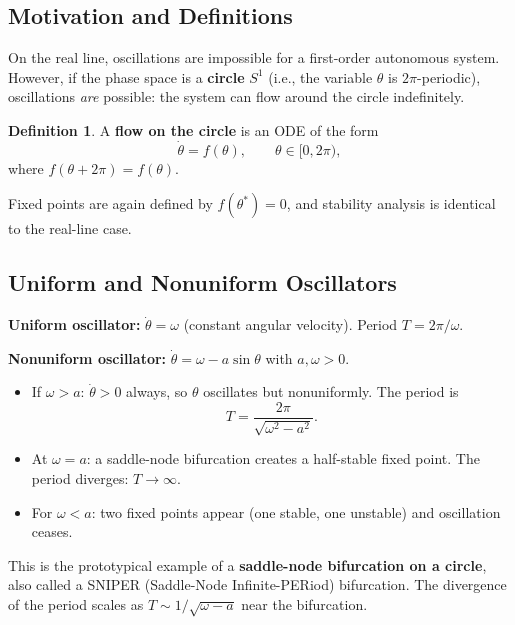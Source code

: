 \documentclass[11pt,letterpaper]{article}
\theoremstyle{definition}
\newtheorem{definition}{Definition}[section]
\theoremstyle{plain}
\theoremstyle{remark}
\newcommand{\thetadot}{\dot{\theta}}
\begin{document}
\subsection{Motivation and Definitions}

On the real line, oscillations are impossible for a first-order autonomous
system.  However, if the phase space is a \textbf{circle} $S^1$
(i.e., the variable $\theta$ is $2\pi$-periodic), oscillations \emph{are}
possible: the system can flow around the circle indefinitely.

\begin{definition}
A \textbf{flow on the circle} is an ODE of the form
\begin{equation}
  \thetadot = f(\theta), \qquad \theta \in [0, 2\pi),
\end{equation}
where $f(\theta+2\pi) = f(\theta)$.
\end{definition}

Fixed points are again defined by $f(\theta^*)=0$, and stability analysis is
identical to the real-line case.

\subsection{Uniform and Nonuniform Oscillators}

\textbf{Uniform oscillator:} $\thetadot = \omega$ (constant angular
velocity).  Period $T = 2\pi/\omega$.

\textbf{Nonuniform oscillator:} $\thetadot = \omega - a\sin\theta$
with $a,\omega > 0$.
\begin{itemize}[leftmargin=2em]
\item If $\omega > a$: $\thetadot > 0$ always, so $\theta$ oscillates but
      nonuniformly.  The period is
      \begin{equation}\label{eq:nonuniform-period}
        T = \frac{2\pi}{\sqrt{\omega^2 - a^2}}.
      \end{equation}
\item At $\omega = a$: a saddle-node bifurcation creates a half-stable
      fixed point.  The period diverges: $T\to\infty$.
\item For $\omega < a$: two fixed points appear (one stable, one unstable)
      and oscillation ceases.
\end{itemize}

This is the prototypical example of a \textbf{saddle-node bifurcation on a
circle}, also called a SNIPER (Saddle-Node Infinite-PERiod) bifurcation.
The divergence of the period scales as $T \sim 1/\sqrt{\omega-a}$ near the
bifurcation.
\end{document}
